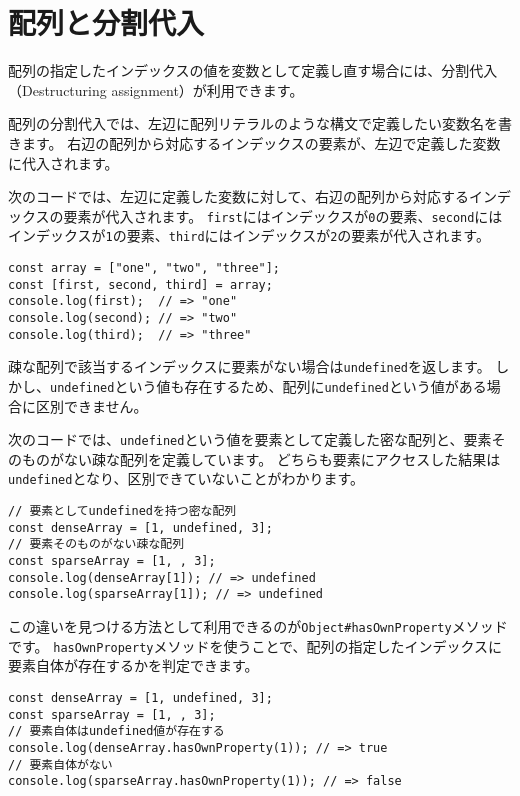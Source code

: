 \hypertarget{array-destructuring}{%
\section[配列と分割代入]{配列と分割代入\,\protect{}}\label{array-destructuring}}

配列の指定したインデックスの値を変数として定義し直す場合には、分割代入（Destructuring
assignment）が利用できます。

配列の分割代入では、左辺に配列リテラルのような構文で定義したい変数名を書きます。
右辺の配列から対応するインデックスの要素が、左辺で定義した変数に代入されます。

次のコードでは、左辺に定義した変数に対して、右辺の配列から対応するインデックスの要素が代入されます。
\texttt{first}にはインデックスが\texttt{0}の要素、\texttt{second}にはインデックスが\texttt{1}の要素、\texttt{third}にはインデックスが\texttt{2}の要素が代入されます。

\begin{lstlisting}
const array = ["one", "two", "three"];
const [first, second, third] = array;
console.log(first);  // => "one"
console.log(second); // => "two"
console.log(third);  // => "three"
\end{lstlisting}

\begin{tcolorbox}[enhanced jigsaw,breakable,title=undefinedの要素と未定義の要素の違い]\label{diff-undefined-and-no-element}

疎な配列で該当するインデックスに要素がない場合は\texttt{undefined}を返します。
しかし、\texttt{undefined}という値も存在するため、配列に\texttt{undefined}という値がある場合に区別できません。

次のコードでは、\texttt{undefined}という値を要素として定義した密な配列と、要素そのものがない疎な配列を定義しています。
どちらも要素にアクセスした結果は\texttt{undefined}となり、区別できていないことがわかります。

\begin{lstlisting}
// 要素としてundefinedを持つ密な配列
const denseArray = [1, undefined, 3];
// 要素そのものがない疎な配列
const sparseArray = [1, , 3];
console.log(denseArray[1]); // => undefined
console.log(sparseArray[1]); // => undefined
\end{lstlisting}

この違いを見つける方法として利用できるのが\texttt{Object\#hasOwnProperty}メソッドです。
\texttt{hasOwnProperty}メソッドを使うことで、配列の指定したインデックスに要素自体が存在するかを判定できます。

\begin{lstlisting}
const denseArray = [1, undefined, 3];
const sparseArray = [1, , 3];
// 要素自体はundefined値が存在する
console.log(denseArray.hasOwnProperty(1)); // => true
// 要素自体がない
console.log(sparseArray.hasOwnProperty(1)); // => false
\end{lstlisting}
\end{tcolorbox}

